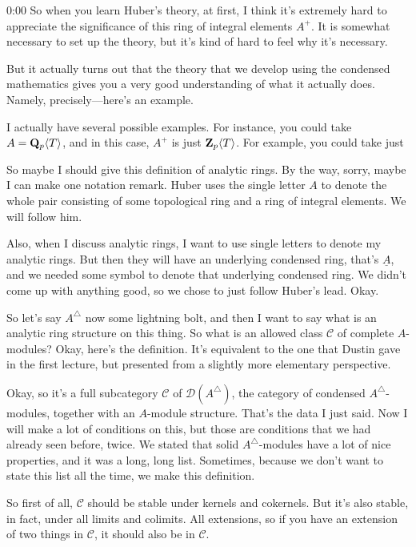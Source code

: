 \begin{unfinished}{0:00}
So when you learn Huber's theory, at first, I think it's extremely hard to appreciate the significance of this ring of integral elements $A^+$. It is somewhat necessary to set up the theory, but it's kind of hard to feel why it's necessary.

But it actually turns out that the theory that we develop using the condensed mathematics gives you a very good understanding of what it actually does. Namely, precisely---here's an example.

I actually have several possible examples. For instance, you could take $A = \mathbf Q_p\langle T\rangle$, and in this case, $A^+$ is just $\mathbf Z_p\langle T \rangle$. For example, you could take just 

So maybe I should give this definition of analytic rings. By the way, sorry, maybe I can make one notation remark. Huber uses the single letter $A$ to denote the whole pair consisting of some topological ring and a ring of integral elements. We will follow him.

Also, when I discuss analytic rings, I want to use single letters to denote my analytic rings. But then they will have an underlying condensed ring, that's $\underline{A}$, and we needed some symbol to denote that underlying condensed ring. We didn't come up with anything good, so we chose to just follow Huber's lead. Okay.

So let's say $A^\triangle$ now some lightning bolt, and then I want to say what is an analytic ring structure on this thing. So what is an allowed class $\mathcal{C}$ of complete $A$-modules? Okay, here's the definition. It's equivalent to the one that Dustin gave in the first lecture, but presented from a slightly more elementary perspective.

Okay, so it's a full subcategory $\mathcal{C}$ of $\mathcal{D}(A^\triangle)$, the category of condensed $A^\triangle$-modules, together with an $A$-module structure. That's the data I just said. Now I will make a lot of conditions on this, but those are conditions that we had already seen before, twice. We stated that solid $A^\triangle$-modules have a lot of nice properties, and it was a long, long list. Sometimes, because we don't want to state this list all the time, we make this definition.

So first of all, $\mathcal{C}$ should be stable under kernels and cokernels. But it's also stable, in fact, under all limits and colimits. All extensions, so if you have an extension of two things in $\mathcal{C}$, it should also be in $\mathcal{C}$.


\end{unfinished}

